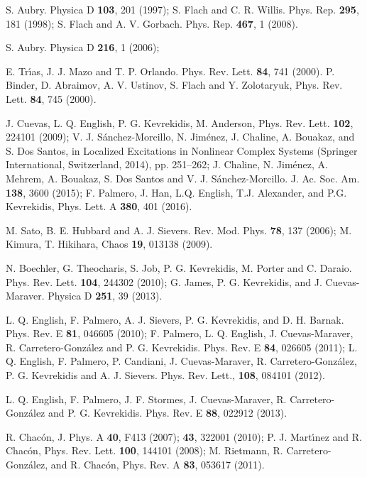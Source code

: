 \documentclass[showpacs,preprintnumbers,10pt,onecolumn]{revtex4}%
\begin{document}
\begin{thebibliography}{99}                                                                                               %

S. Aubry. Physica D \textbf{103}, 201 (1997); S.
Flach and C. R. Willis. Phys. Rep. \textbf{295}, 181 (1998); S. Flach and A.
V. Gorbach. Phys. Rep. \textbf{467}, 1 (2008).

S. Aubry. Physica D \textbf{216}, 1 (2006);

E. Tr\'{\i}as, J. J. Mazo and T. P. Orlando. Phys. Rev. Lett.
\textbf{84}, 741 (2000). P. Binder, D. Abraimov, A. V. Ustinov, S. Flach and
Y. Zolotaryuk, Phys. Rev. Lett. \textbf{84}, 745 (2000).

J. Cuevas, L. Q. English, P. G. Kevrekidis, M. Anderson,
Phys. Rev. Lett. \textbf{102}, 224101 (2009); V. J. S\'{a}nchez-Morcillo, N.
Jim\'{e}nez, J. Chaline, A. Bouakaz, and S. Dos Santos, in Localized
Excitations in Nonlinear Complex Systems (Springer International, Switzerland,
2014), pp. 251--262; J. Chaline, N. Jim\'{e}nez, A. Mehrem, A. Bouakaz, S. Dos
Santos and V. J. S\'{a}nchez-Morcillo. J. Ac. Soc. Am. \textbf{138}, 3600 (2015); 
F. Palmero, J. Han, L.Q. English, T.J. Alexander, and P.G. Kevrekidis,  Phys. Lett. A  \textbf{380}, 401 (2016).

M. Sato, B. E. Hubbard and A. J. Sievers. Rev. Mod. Phys.
\textbf{78}, 137 (2006); M. Kimura, T. Hikihara, Chaos \textbf{19}, 013138 (2009).

N. Boechler, G. Theocharis, S. Job, P. G. Kevrekidis, M.
Porter and C. Daraio. Phys. Rev. Lett. \textbf{104}, 244302 (2010); G. James,
P. G. Kevrekidis, and J. Cuevas-Maraver. Physica D \textbf{251}, 39 (2013).

L. Q. English, F. Palmero, A. J. Sievers, P. G.
Kevrekidis, and D. H. Barnak. Phys. Rev. E \textbf{81}, 046605 (2010); F.
Palmero, L. Q. English, J. Cuevas-Maraver, R. Carretero-Gonz\'{a}lez and P. G.
Kevrekidis. Phys. Rev. E \textbf{84}, 026605 (2011); L. Q. English, F.
Palmero, P. Candiani, J. Cuevas-Maraver, R. Carretero-Gonz\'{a}lez, P. G.
Kevrekidis and A. J. Sievers. Phys. Rev. Lett., \textbf{108}, 084101 (2012).

L. Q. English, F. Palmero, J. F. Stormes, J.
Cuevas-Maraver, R. Carretero-Gonz\'{a}lez and P. G. Kevrekidis. Phys. Rev. E
\textbf{88}, 022912 (2013).

R. Chac\'{o}n, J. Phys. A \textbf{40}, F413 (2007); \textbf{43},
322001 (2010); P. J. Mart\'{\i}nez and R. Chac\'{o}n, Phys. Rev. Lett.
\textbf{100}, 144101 (2008); M. Rietmann, R. Carretero-Gonz\'{a}lez, and R.
Chac\'{o}n, Phys. Rev. A \textbf{83}, 053617 (2011).


\end{thebibliography}
\end{document}
